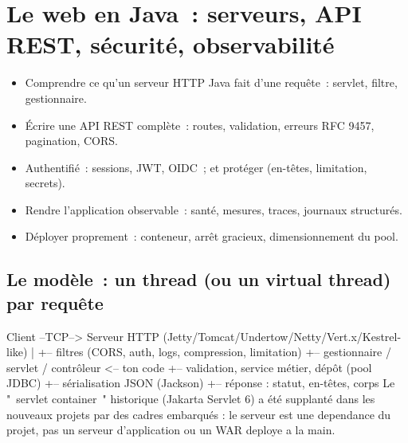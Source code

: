\chapter{Le web en Java~: serveurs, API REST, s\'ecurit\'e, observabilit\'e}
\label{ch-java-web}

\begin{objectif}
\begin{itemize}
  \item Comprendre ce qu'un serveur HTTP Java fait d'une requ\^ete~: servlet, filtre, gestionnaire.
  \item \'Ecrire une API REST compl\`ete~: routes, validation, erreurs RFC 9457, pagination, CORS.
  \item Authentifi\'e~: sessions, JWT, OIDC~; et prot\'eger (en-t\^etes, limitation, secrets).
  \item Rendre l'application observable~: sant\'e, mesures, traces, journaux structur\'es.
  \item D\'eployer proprement~: conteneur, arr\^et gracieux, dimensionnement du pool.
\end{itemize}
\end{objectif}

\section{Le mod\`ele~: un thread (ou un virtual thread) par requ\^ete}

\begin{codeplain}
Client --TCP--> Serveur HTTP (Jetty/Tomcat/Undertow/Netty/Vert.x/Kestrel-like)
                    |
                    +-- filtres (CORS, auth, logs, compression, limitation)
                    +-- gestionnaire / servlet / contr\^oleur   <-- ton code
                            +-- validation, service m\'etier, d\'ep\^ot (pool JDBC)
                            +-- s\'erialisation JSON (Jackson)
                    +-- r\'eponse : statut, en-t\^etes, corps
Le "~servlet container~" historique (Jakarta Servlet 6) a \'et\'e supplant\'e dans les nouveaux
projets par des cadres embarqu\'es : le serveur est une dependance du projet, pas un
serveur d'application ou un WAR deploye a la main.
\end{codeplain}

